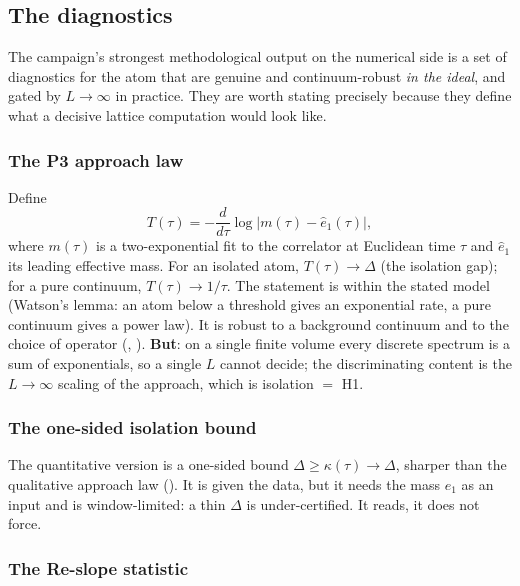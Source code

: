 \subsection{The diagnostics}

The campaign's strongest methodological output on the numerical side is a set of diagnostics for
the atom that are genuine and continuum-robust \emph{in the ideal}, and gated by $L\to\infty$ in
practice. They are worth stating precisely because they define what a decisive lattice
computation would look like.

\subsubsection{The P3 approach law}

Define
\begin{equation}
T(\tau)=-\frac{d}{d\tau}\log\bigl|m(\tau)-\hat e_1(\tau)\bigr| ,
\label{eq:approachlaw}
\end{equation}
where $m(\tau)$ is a two-exponential fit to the correlator at Euclidean time $\tau$ and
$\hat e_1$ its leading effective mass. For an isolated atom, $T(\tau)\to\Delta$ (the isolation
gap); for a pure continuum, $T(\tau)\to1/\tau$. The statement is \LT{} within the stated model
(Watson's lemma: an atom below a threshold gives an exponential rate, a pure continuum gives a
power law). It is robust to a background continuum and to the choice of operator
(, ). \textbf{But}: on a single finite volume every
discrete spectrum is a sum of exponentials, so a single $L$ cannot decide; the discriminating
content is the $L\to\infty$ scaling of the approach, which is isolation $=$ H1.

\subsubsection{The one-sided isolation bound}

The quantitative version is a one-sided bound
$\Delta\ge\kappa(\tau)\to\Delta$, sharper than the qualitative approach law
(). It is \LT{} given the data, but it needs the mass $e_1$ as an input and
is window-limited: a thin $\Delta$ is under-certified. It reads, it does not force.

\subsubsection{The Re-slope statistic}

